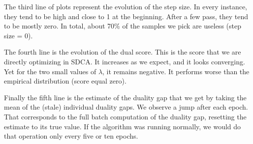\documentclass{article}
\DeclareMathOperator{\1}{\mathbb{1}}
\begin{document}
The third line of plots represent the evolution of the step size.
In every instance, they tend to be high and close to 1 at the beginning.
After a few pass, they tend to be mostly zero.
In total, about 70\% of the samples we pick are useless (step size = 0).

The fourth line is the evolution of the dual score.
This is the score that we are directly optimizing in SDCA.
It increases as we expect, and it looks converging.
Yet for the two small values of $\lambda$, it remains negative.
It performs worse than the empirical distribution (score equal zero).

Finally the fifth line is the estimate of the duality gap that we get by taking the mean of the (stale) individual duality gaps.
We observe a jump after each epoch.
That corresponds to the full batch computation of the duality gap, resetting the estimate to its true value.
If the algorithm was running normally, we would do that operation only every five or ten epochs.
\end{document}
